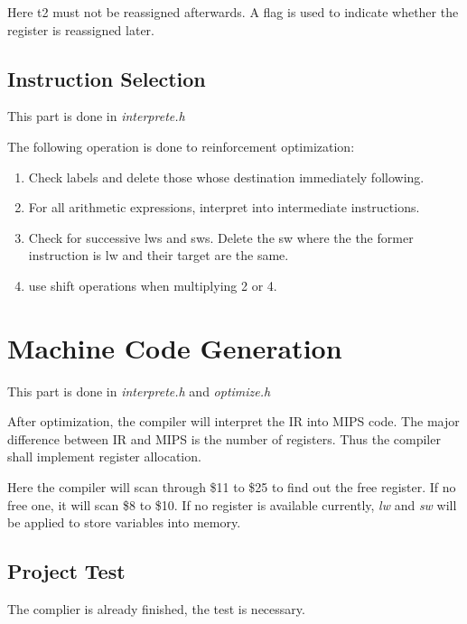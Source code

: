 \documentclass{article}
\begin{document}
Here t2 must not be reassigned afterwards.
A flag is used to indicate whether the register is reassigned later. 


\subsection{Instruction Selection}
This part is done in \textit{interprete.h}

The following operation is done to reinforcement optimization:

\begin{enumerate}
\item
Check labels and delete those whose destination immediately following.

\item
For all arithmetic expressions, interpret into intermediate instructions. 

\item
Check for successive lws and sws. Delete the sw where the the former instruction is lw and their target are the same. 

\item
use shift operations when multiplying 2 or 4.

\end{enumerate}

\section{Machine Code Generation}
This part is done in \textit{interprete.h} and \textit{optimize.h}

After optimization, the compiler will interpret the IR into MIPS code. The major difference between IR and MIPS is the number of registers. Thus the compiler shall implement register allocation.

Here the compiler will scan through \$11 to \$25 to find out the free register. If no free one, it will scan \$8 to \$10. If no register is available currently, \textit{lw} and \textit{sw} will be applied to store variables into memory. 

\subsection{Project Test}
The complier is already finished, the test is necessary. 
\end{document}

